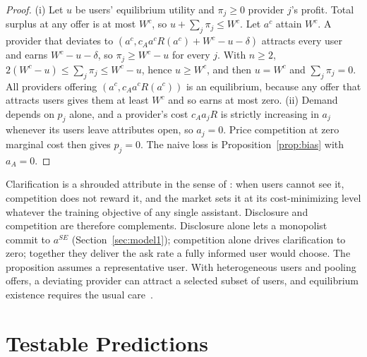 \documentclass[11pt]{article}
\begin{document}
\begin{proof}
(i) Let $u$ be users' equilibrium utility and $\pi_j \ge 0$ provider $j$'s profit. Total surplus at any offer is at most $W^c$, so $u + \sum_j \pi_j \le W^c$. Let $a^c$ attain $W^c$. A provider that deviates to $(a^c, c_A a^c R(a^c) + W^c - u - \delta)$ attracts every user and earns $W^c - u - \delta$, so $\pi_j \ge W^c - u$ for every $j$. With $n \ge 2$, $2(W^c - u) \le \sum_j \pi_j \le W^c - u$, hence $u \ge W^c$, and then $u = W^c$ and $\sum_j \pi_j = 0$. All providers offering $(a^c, c_A a^c R(a^c))$ is an equilibrium, because any offer that attracts users gives them at least $W^c$ and so earns at most zero.
(ii) Demand depends on $p_j$ alone, and a provider's cost $c_A a_j R$ is strictly increasing in $a_j$ whenever its users leave attributes open, so $a_j = 0$. Price competition at zero marginal cost then gives $p_j = 0$. The naive loss is Proposition~\ref{prop:bias} with $a_A = 0$.
\end{proof}

Clarification is a shrouded attribute in the sense of \citet{gabaix-laibson2006}: when users cannot see it, competition does not reward it, and the market sets it at its cost-minimizing level whatever the training objective of any single assistant. Disclosure and competition are therefore complements. Disclosure alone lets a monopolist commit to $a^{SE}$ (Section~\ref{sec:model1}); competition alone drives clarification to zero; together they deliver the ask rate a fully informed user would choose. The proposition assumes a representative user. With heterogeneous users and pooling offers, a deviating provider can attract a selected subset of users, and equilibrium existence requires the usual care~\citep{rothschild-stiglitz1976}.

\section{Testable Predictions}
\label{sec:predictions}
\end{document}
